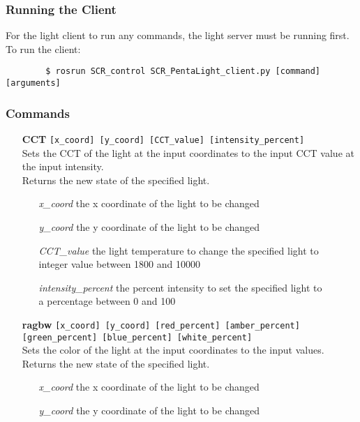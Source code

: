 \documentclass[twoside]{article}
\begin{document}
	\subsubsection{Running the Client}
	For the light client to run any commands, the light server must be running first.\\
	To run the client:
	\begin{verbatim}
	    $ rosrun SCR_control SCR_PentaLight_client.py [command] [arguments]
	\end{verbatim}
	\subsubsection{Commands}
	\begin{enumerate}
		\item[\bf CCT] \verb|[x_coord] [y_coord] [CCT_value] [intensity_percent]|\\
		Sets the CCT of the light at the input coordinates to the input CCT value at the input intensity.\\
		Returns the new state of the specified light.
		\begin{enumerate}[leftmargin=3\parindent]
			\item[{\it x\_coord}] the x coordinate of the light to be changed
			\item[{\it y\_coord}] the y coordinate of the light to be changed
			\item[{\it CCT\_value}] the light temperature to change the specified light to\\
			integer value between 1800 and 10000
			\item[{\it intensity\_percent}] the percent intensity to set the specified light to\\
			a percentage between 0 and 100
		\end{enumerate}
		\item[\bf ragbw] \verb|[x_coord] [y_coord] [red_percent] [amber_percent]|\\
						 \verb|[green_percent] [blue_percent] [white_percent]|\\
		Sets the color of the light at the input coordinates to the input values.\\
		Returns the new state of the specified light.
		\begin{enumerate}[leftmargin=3\parindent]
			\item[{\it x\_coord}] the x coordinate of the light to be changed
			\item[{\it y\_coord}] the y coordinate of the light to be changed

\end{enumerate}
\end{enumerate}
\end{document}
